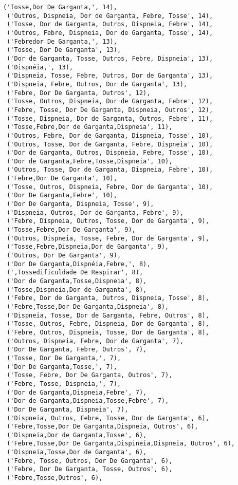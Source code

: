 \documentclass[11pt]{article}
\begin{document}
\begin{tcolorbox}[breakable, size=fbox, boxrule=.5pt, pad at break*=1mm, opacityfill=0]
\begin{Verbatim}[commandchars=\\\{\}]
 ('Tosse,Dor De Garganta,', 14),
 ('Outros, Dispneia, Dor de Garganta, Febre, Tosse', 14),
 ('Tosse, Dor de Garganta, Outros, Dispneia, Febre', 14),
 ('Outros, Febre, Dispneia, Dor de Garganta, Tosse', 14),
 ('Febredor De Garganta,', 13),
 ('Tosse, Dor De Garganta', 13),
 ('Dor de Garganta, Tosse, Outros, Febre, Dispneia', 13),
 ('Dispnéia,', 13),
 ('Dispneia, Tosse, Febre, Outros, Dor de Garganta', 13),
 ('Dispneia, Febre, Outros, Dor de Garganta', 13),
 ('Febre, Dor De Garganta, Outros', 12),
 ('Tosse, Outros, Dispneia, Dor de Garganta, Febre', 12),
 ('Febre, Tosse, Dor De Garganta, Dispneia, Outros', 12),
 ('Tosse, Dispneia, Dor de Garganta, Outros, Febre', 11),
 ('Tosse,Febre,Dor de Garganta,Dispneia', 11),
 ('Outros, Febre, Dor de Garganta, Dispneia, Tosse', 10),
 ('Outros, Tosse, Dor de Garganta, Febre, Dispneia', 10),
 ('Dor de Garganta, Outros, Dispneia, Febre, Tosse', 10),
 ('Dor de Garganta,Febre,Tosse,Dispneia', 10),
 ('Outros, Tosse, Dor de Garganta, Dispneia, Febre', 10),
 ('Febre,Dor De Garganta', 10),
 ('Tosse, Outros, Dispneia, Febre, Dor de Garganta', 10),
 ('Dor De Garganta,Febre', 10),
 ('Dor De Garganta, Dispneia, Tosse', 9),
 ('Dispneia, Outros, Dor de Garganta, Febre', 9),
 ('Febre, Dispneia, Outros, Tosse, Dor de Garganta', 9),
 ('Tosse,Febre,Dor De Garganta', 9),
 ('Outros, Dispneia, Tosse, Febre, Dor de Garganta', 9),
 ('Tosse,Febre,Dispneia,Dor de Garganta', 9),
 ('Outros, Dor De Garganta', 9),
 ('Dor De Garganta,Dispnéia,Febre,', 8),
 (',Tossedificuldade De Respirar', 8),
 ('Dor de Garganta,Tosse,Dispneia', 8),
 ('Tosse,Dispneia,Dor de Garganta', 8),
 ('Febre, Dor de Garganta, Outros, Dispneia, Tosse', 8),
 ('Febre,Tosse,Dor De Garganta,Dispneia', 8),
 ('Dispneia, Tosse, Dor de Garganta, Febre, Outros', 8),
 ('Tosse, Outros, Febre, Dispneia, Dor de Garganta', 8),
 ('Febre, Outros, Dispneia, Tosse, Dor de Garganta', 8),
 ('Outros, Dispneia, Febre, Dor de Garganta', 7),
 ('Dor De Garganta, Febre, Outros', 7),
 ('Tosse, Dor De Garganta,', 7),
 ('Dor De Garganta,Tosse,', 7),
 ('Tosse, Febre, Dor De Garganta, Outros', 7),
 ('Febre, Tosse, Dispneia,', 7),
 ('Dor de Garganta,Dispneia,Febre', 7),
 ('Dor de Garganta,Dispneia,Tosse,Febre', 7),
 ('Dor De Garganta, Dispneia', 7),
 ('Dispneia, Outros, Febre, Tosse, Dor de Garganta', 6),
 ('Febre,Tosse,Dor De Garganta,Dispneia, Outros', 6),
 ('Dispneia,Dor de Garganta,Tosse', 6),
 ('Febre,Tosse,Dor De Garganta,Dispineia,Dispneia, Outros', 6),
 ('Dispneia,Tosse,Dor de Garganta', 6),
 ('Febre, Tosse, Outros, Dor De Garganta', 6),
 ('Febre, Dor De Garganta, Tosse, Outros', 6),
 ('Febre,Tosse,Outros', 6),

\end{Verbatim}
\end{tcolorbox}
\end{document}
